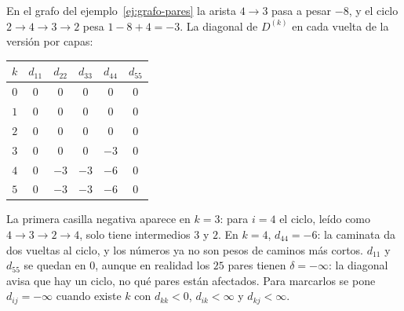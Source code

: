 \documentclass[11pt,letterpaper]{article}
\begin{document}
\begin{ejemplo}
  \label{ej:floyd-ciclo-negativo}
  En el grafo del ejemplo~\ref{ej:grafo-pares} la arista $4 \to 3$
  pasa a pesar $-8$, y el ciclo $2 \to 4 \to 3 \to 2$ pesa
  $1 - 8 + 4 = -3$. La diagonal de $D^{(k)}$ en cada vuelta de la
  versión por capas:
  \begin{center}
  \small
  \begin{tabular}{cccccc}
    \toprule
    $k$ & $d_{11}$ & $d_{22}$ & $d_{33}$ & $d_{44}$ & $d_{55}$ \\
    \midrule
    $0$ & $0$ & $0$ & $0$ & $0$ & $0$ \\
    $1$ & $0$ & $0$ & $0$ & $0$ & $0$ \\
    $2$ & $0$ & $0$ & $0$ & $0$ & $0$ \\
    $3$ & $0$ & $0$ & $0$ & $-3$ & $0$ \\
    $4$ & $0$ & $-3$ & $-3$ & $-6$ & $0$ \\
    $5$ & $0$ & $-3$ & $-3$ & $-6$ & $0$ \\
    \bottomrule
  \end{tabular}
  \end{center}
  La primera casilla negativa aparece en $k = 3$: para $i = 4$ el
  ciclo, leído como $4 \to 3 \to 2 \to 4$, solo tiene intermedios $3$
  y $2$. En $k = 4$, $d_{44} = -6$: la caminata da dos vueltas al
  ciclo, y los números ya no son pesos de caminos más cortos.
  $d_{11}$ y $d_{55}$ se quedan en $0$, aunque en realidad los $25$
  pares tienen $\delta = -\infty$: la diagonal avisa que hay un ciclo,
  no qué pares están afectados. Para marcarlos se pone
  $d_{ij} = -\infty$ cuando existe $k$ con $d_{kk} < 0$,
  $d_{ik} < \infty$ y $d_{kj} < \infty$.
\end{ejemplo}
\end{document}
